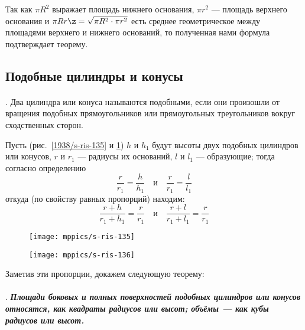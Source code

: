 Так как $\pi R^2$ выражает площадь нижнего основания, $\pi r^2$ — площадь верхнего основания и $\pi Rr \z= \sqrt{\pi R^2\cdot \pi r^2}$ есть среднее геометрическое между площадями верхнего и нижнего оснований, то полученная нами формула подтверждает теорему.

\subsection*{Подобные цилиндры и конусы}

\paragraph{}\label{1938/s123}
.
Два цилиндра или конуса называются подобными, если они произошли от вращения подобных прямоугольников или прямоугольных треугольников вокруг сходственных сторон.

Пусть (рис.~\ref{1938/s-ris-135} и \ref{1938/s-ris-136}) $h$ и $h_1$ будут высоты двух подобных цилиндров или конусов, $r$ и $r_1$ — радиусы их оснований, $l$ и $l_1$ — образующие;
тогда согласно определению
\[\frac r{r_1}=\frac h{h_1}\quad\text{и}\quad\frac r{r_1}=\frac l{l_1}\]
откуда (по свойству равных пропорций) находим:
\[\frac {r+h}{r_1+h_1}=\frac r{r_1}
\quad\text{и}\quad
\frac {r+l}{r_1+l_1}=\frac r{r_1}\]

\begin{figure}[!ht]
\begin{minipage}{.48\textwidth}
\centering
\texttt{[image: mppics/s-ris-135]}
\end{minipage}\hfill
\begin{minipage}{.48\textwidth}
\centering
\texttt{[image: mppics/s-ris-136]}
\end{minipage}

\medskip

\begin{minipage}{.48\textwidth}
\centering
\caption{}\label{1938/s-ris-135}
\end{minipage}\hfill
\begin{minipage}{.48\textwidth}
\centering
\caption{}\label{1938/s-ris-136}
\end{minipage}
\vskip-4mm
\end{figure}

Заметив эти пропорции, докажем следующую теорему:

\paragraph{}\label{1938/s124}
.
\textbf{\emph{Площади боковых и полных поверхностей подобных цилиндров или конусов относятся, как квадраты радиусов или высот;
объёмы — как кубы радиусов или высот.}}

